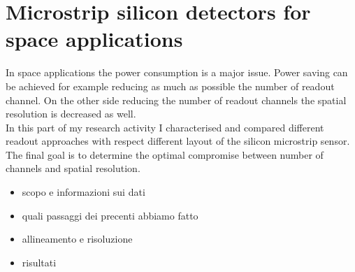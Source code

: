 \chapter{Microstrip silicon detectors for space applications}
\label{cap:gamma400}

In space applications the power consumption is a major issue. Power saving can
be achieved for example reducing as much as possible the number of readout
channel. On the other side reducing the number of readout channels the spatial
resolution is decreased as well.\\
In this part of my research activity I characterised and compared different
readout approaches with respect different layout of the silicon microstrip
sensor. The final goal is to determine the optimal compromise between number of
channels and spatial resolution.


{ \color{red}
\begin{itemize}
\item scopo e informazioni sui dati
\item quali passaggi dei precenti abbiamo fatto
\item allineamento e risoluzione
\item risultati
\end{itemize}
}


